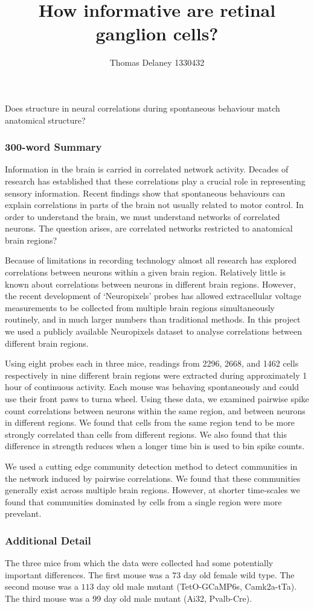 \documentclass[a4paper,12pt]{article}
\title{How informative are retinal ganglion cells?}
\author{Thomas Delaney 1330432}
\theoremstyle{definition}
\begin{document}
Does structure in neural correlations during spontaneous behaviour match anatomical structure?

\subsubsection*{300-word Summary}
Information in the brain is carried in correlated network activity. Decades of research has established that these correlations play a crucial role in representing sensory information\cite{cohen1}. Recent findings show that spontaneous behaviours can explain correlations in parts of the brain not usually related to motor control\cite{stringer}. In order to understand the brain, we must understand networks of correlated neurons. The question arises, are correlated networks restricted to anatomical brain regions?

Because of limitations in recording technology almost all research has explored correlations between neurons within a given brain region. Relatively little is known about correlations between neurons in different brain regions. However, the recent development of `Neuropixels' probes\cite{jun} has allowed extracellular voltage measurements to be collected from multiple brain regions simultaneously routinely, and in much larger numbers than traditional methods. In this project we used a publicly available Neuropixels dataset to analyse correlations between different brain regions.

Using eight probes each in three mice, readings from 2296, 2668, and 1462 cells respectively in nine different brain regions were extracted during approximately 1 hour of continuous activity. Each mouse was behaving spontaneously and could use their front paws to turna wheel\cite{stringer}. Using these data, we examined pairwise spike count correlations between neurons within the same region, and between neurons in different regions. We found that cells from the same region tend to be more strongly correlated than cells from different regions. We also found that this difference in strength reduces when a longer time bin is used to bin spike counts.

We used a cutting edge community detection method\cite{humphries} to detect communities in the network induced by pairwise correlations. We found that these communities generally exist across multiple brain regions. However, at shorter time-scales we found that communities dominated by cells from a single region were more prevelant. 

\subsubsection*{Additional Detail}
The three mice from which the data were collected had some potentially important differences. The first mouse was a $73$ day old female wild type. The second mouse was a $113$ day old male mutant (TetO-GCaMP6s, Camk2a-tTa). The third mouse was a $99$ day old male mutant (Ai32, Pvalb-Cre).
\end{document}
